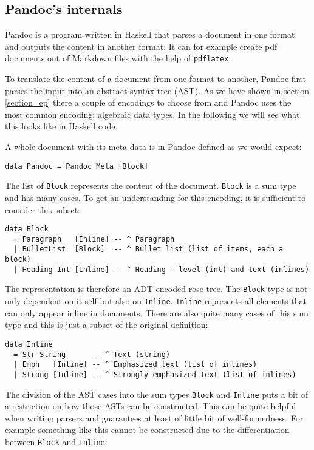 \subsection{Pandoc's internals}

Pandoc is a program written in Haskell that parses a document in one format and
outputs the content in another format. It can for example create pdf documents
out of Markdown files with the help of \texttt{pdflatex}.

To translate the content of a document from one format to another, Pandoc first
parses the input into an abstract syntax tree (AST). As we have shown in section
\ref{section_ep} there a couple of encodings to choose from and Pandoc uses the
most common encoding: algebraic data types. In the following we will see what
this looks like in Haskell code.

A whole document with its meta data is in Pandoc defined as we would expect:

\begin{lstlisting}
data Pandoc = Pandoc Meta [Block]
\end{lstlisting}

The list of \texttt{Block} represents the content of the document.
\texttt{Block} is a sum type and has many cases. To get an understanding for
this encoding, it is sufficient to consider this subset:

\begin{lstlisting}
data Block
  = Paragraph   [Inline] -- ^ Paragraph
  | BulletList  [Block]  -- ^ Bullet list (list of items, each a block)
  | Heading Int [Inline] -- ^ Heading - level (int) and text (inlines)
\end{lstlisting}

The representation is therefore an ADT encoded rose tree. The \texttt{Block}
type is not only dependent on it self but also on \texttt{Inline}.
\texttt{Inline} represents all elements that can only appear inline in
documents. There are also quite many cases of this sum type and this is just
a subset of the original definition:

\begin{lstlisting}
data Inline
  = Str String      -- ^ Text (string)
  | Emph   [Inline] -- ^ Emphasized text (list of inlines)
  | Strong [Inline] -- ^ Strongly emphasized text (list of inlines)
\end{lstlisting}

The division of the AST cases into the sum types \texttt{Block} and
\texttt{Inline} puts a bit of a restriction on how those ASTs can be
constructed. This can be quite helpful when writing parsers and guarantees at
least of little bit of well-formedness. For example something like this cannot
be constructed due to the differentiation between \texttt{Block} and
\texttt{Inline}:

